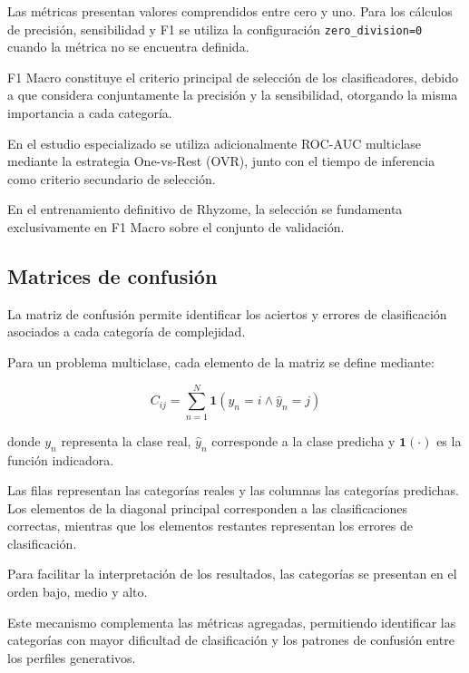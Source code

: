 Las métricas presentan valores comprendidos entre cero y uno. Para los cálculos de precisión, sensibilidad y F1 se utiliza la configuración \texttt{zero\_division=0} cuando la métrica no se encuentra definida.

F1 Macro constituye el criterio principal de selección de los clasificadores, debido a que considera conjuntamente la precisión y la sensibilidad, otorgando la misma importancia a cada categoría.

En el estudio especializado se utiliza adicionalmente ROC-AUC multiclase mediante la estrategia One-vs-Rest (OVR), junto con el tiempo de inferencia como criterio secundario de selección.

En el entrenamiento definitivo de Rhyzome, la selección se fundamenta exclusivamente en F1 Macro sobre el conjunto de validación.


\subsection{Matrices de confusión}
\label{subsec:matrices_confusion}

La matriz de confusión permite identificar los aciertos y errores de clasificación asociados a cada categoría de complejidad.

Para un problema multiclase, cada elemento de la matriz se define mediante:

\begin{equation}
	C_{ij} =
	\sum_{n=1}^{N}
	\mathbf{1}(y_n=i \land \hat{y}_n=j)
	\label{eq:matriz_confusion}
\end{equation}

donde $y_n$ representa la clase real, $\hat{y}_n$ corresponde a la clase predicha y $\mathbf{1}(\cdot)$ es la función indicadora.

Las filas representan las categorías reales y las columnas las categorías predichas. Los elementos de la diagonal principal corresponden a las clasificaciones correctas, mientras que los elementos restantes representan los errores de clasificación.

Para facilitar la interpretación de los resultados, las categorías se presentan en el orden bajo, medio y alto.

Este mecanismo complementa las métricas agregadas, permitiendo identificar las categorías con mayor dificultad de clasificación y los patrones de confusión entre los perfiles generativos.

